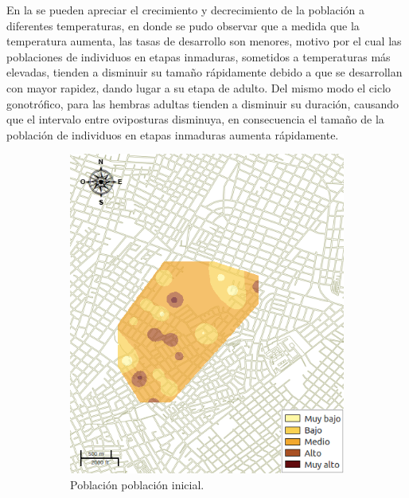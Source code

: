 En la  se pueden apreciar el crecimiento y decrecimiento de la población
a diferentes temperaturas, en donde se pudo observar que a medida que la temperatura aumenta, las
tasas de desarrollo son menores, motivo por el cual las poblaciones de individuos en etapas
inmaduras, sometidos a temperaturas más elevadas, tienden a disminuir su tamaño rápidamente debido
a que se desarrollan con mayor rapidez, dando lugar a su etapa de adulto. Del mismo modo el ciclo
gonotrófico, para las hembras adultas tienden a disminuir su duración, causando que el intervalo
entre oviposturas disminuya, en consecuencia el tamaño de la población de individuos en etapas
inmaduras aumenta rápidamente.

\begin{figure}[!htpb]
    \centering
    \begin{subfigure}[b]{0.225\textwidth}
        \includegraphics[width=\textwidth]{../book/capitulo-6/graphics/raster/temp-24-0.png}
        \caption{\label{fig:poblacion-mapas-a}Población población inicial.}
    \end{subfigure}
    ~~~~
    \begin{subfigure}[b]{0.225\textwidth}

\end{subfigure}
\end{figure}
